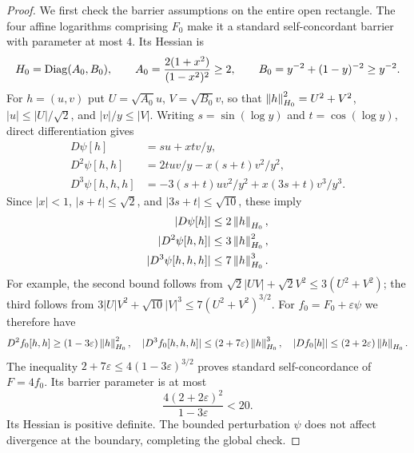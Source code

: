 \begin{proof}
We first check the barrier assumptions on the entire open rectangle.
The four affine logarithms comprising $F_0$ make it a standard
self-concordant barrier with parameter at most $4$. Its Hessian is
\[
 H_0=\operatorname{Diag}(A_0,B_0),\qquad
 A_0=\frac{2(1+x^2)}{(1-x^2)^2}\geq2,\qquad
 B_0=y^{-2}+(1-y)^{-2}\geq y^{-2}.
\]
For $h=(u,v)$ put $U=\sqrt{A_0}u$, $V=\sqrt{B_0}v$, so that
$\left\lVert h\right\rVert_{H_0}^2=U^2+V^2$, $|u|\leq |U|/\sqrt2$, and
$|v|/y\leq |V|$. Writing $s=\sin(\log y)$ and
$t=\cos(\log y)$, direct differentiation gives
\begin{align*}
 D\psi[h]&=su+xtv/y,\\
 D^2\psi[h,h]&=2tuv/y-x(s+t)v^2/y^2,\\
 D^3\psi[h,h,h]&=-3(s+t)uv^2/y^2+x(3s+t)v^3/y^3.
\end{align*}
Since $|x|<1$, $|s+t|\leq\sqrt2$, and
$|3s+t|\leq\sqrt{10}$, these imply
\begin{align}
 |D\psi[h]|&\leq2\left\lVert h\right\rVert_{H_0},\nonumber\\
 |D^2\psi[h,h]|&\leq3\left\lVert h\right\rVert_{H_0}^2,\label{eq:perturbation-bounds}\\
 |D^3\psi[h,h,h]|&\leq7\left\lVert h\right\rVert_{H_0}^3.\nonumber
\end{align}
For example, the second bound follows from
$\sqrt2|UV|+\sqrt2 V^2\leq3(U^2+V^2)$; the third follows from
$3|U|V^2+\sqrt{10}|V|^3\leq7(U^2+V^2)^{3/2}$.
For $f_0=F_0+\varepsilon\psi$ we therefore have
\[
 D^2f_0[h,h]\geq(1-3\varepsilon)\left\lVert h\right\rVert_{H_0}^2,
 \quad |D^3f_0[h,h,h]|\leq(2+7\varepsilon)\left\lVert h\right\rVert_{H_0}^3,
 \quad |Df_0[h]|\leq(2+2\varepsilon)\left\lVert h\right\rVert_{H_0}.
\]
The inequality
$2+7\varepsilon\leq4(1-3\varepsilon)^{3/2}$ proves standard
self-concordance of $F=4f_0$. Its barrier parameter is at most
\begin{equation}
 \frac{4(2+2\varepsilon)^2}{1-3\varepsilon}<20.
 \label{eq:oscillatory-parameter}
\end{equation}
Its Hessian is positive definite. The bounded perturbation $\psi$
does not affect divergence at the boundary, completing the global check.


\end{proof}

